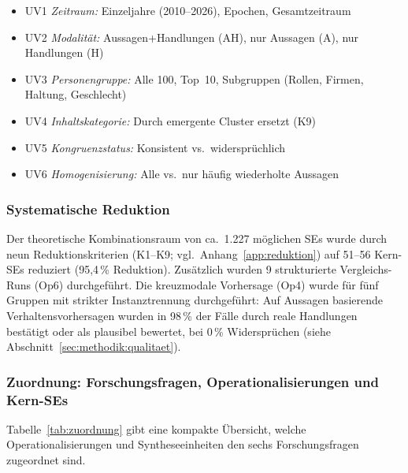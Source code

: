 \documentclass[12pt,a4paper]{article}
\begin{document}
\begin{itemize}[nosep]
  \item UV1 \emph{Zeitraum:} Einzeljahre (2010--2026), Epochen, Gesamtzeitraum
  \item UV2 \emph{Modalität:} Aussagen+Handlungen (AH), nur Aussagen (A), nur Handlungen (H)
  \item UV3 \emph{Personengruppe:} Alle 100, Top~10, Subgruppen (Rollen, Firmen, Haltung, Geschlecht)
  \item UV4 \emph{Inhaltskategorie:} Durch emergente Cluster ersetzt (K9)
  \item UV5 \emph{Kongruenzstatus:} Konsistent vs.\ widersprüchlich
  \item UV6 \emph{Homogenisierung:} Alle vs.\ nur häufig wiederholte Aussagen
\end{itemize}

\subsubsection{Systematische Reduktion}

Der theoretische Kombinationsraum von ca.\ 1.227 möglichen SEs wurde durch neun Reduktionskriterien (K1--K9; vgl.\ Anhang~\ref{app:reduktion}) auf 51--56 Kern-SEs reduziert (95,4\,\% Reduktion). Zusätzlich wurden 9 strukturierte Vergleichs-Runs (Op6) durchgeführt. Die kreuzmodale Vorhersage (Op4) wurde für fünf Gruppen mit strikter Instanztrennung durchgeführt: Auf Aussagen basierende Verhaltensvorhersagen wurden in 98\,\% der Fälle durch reale Handlungen bestätigt oder als plausibel bewertet, bei 0\,\% Widersprüchen (siehe Abschnitt~\ref{sec:methodik:qualitaet}).

\subsubsection{Zuordnung: Forschungsfragen, Operationalisierungen und Kern-SEs}

Tabelle~\ref{tab:zuordnung} gibt eine kompakte Übersicht, welche Operationalisierungen und Syntheseeinheiten den sechs Forschungsfragen zugeordnet sind.
\end{document}
